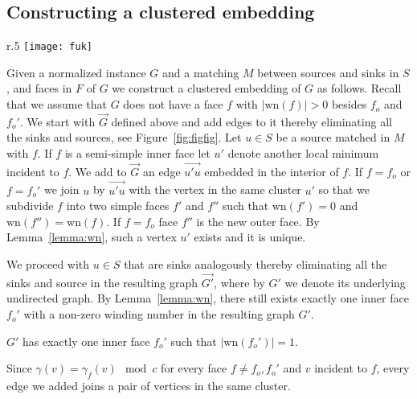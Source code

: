 \documentclass{llncs}
\def\wn{\mathrm{wn}}
\newif\iflong
\begin{document}
\iflong\else
\fi
\subsection{Constructing a clustered embedding}
 \label{sec:const}
 
\begin{wrapfigure}{r}{.5\textwidth}
\centering
\texttt{[image: fuk]}
\caption{Subdividing a semi-simple face   (left). Subdividing a simple face $f_o'$ (right).}

\label{fig:figfig}
\end{wrapfigure}

 
 Given a normalized instance $G$ and a matching $M$ between sources and sinks in $S$, and  faces in $F$ of $G$ we construct a  clustered embedding of $G$ as follows. Recall that we assume that $G$ does not have a face 
 $f$ with $|\wn(f)|>0$ besides $f_o$ and $f_o'$.
  We start with $\overrightarrow{G}$ defined
above and add edges to it thereby eliminating all the sinks and sources, see Figure~\ref{fig:figfig}.
Let $u\in S$ be a source matched in $M$ with $f$. If $f$ is a semi-simple inner face
let $u'$ denote another local minimum  incident to $f$. We add to  $\overrightarrow{G}$
  an edge $\overrightarrow{u'u}$ embedded in the interior of $f$. 
  If $f=f_o$ or $f=f_o'$ we join $u$ by $\overrightarrow{u'u}$ with the vertex in the same cluster $u'$
so that we subdivide $f$ into two simple faces $f'$ and $f''$ such that
$\wn(f')=0$ and $\wn(f'')=\wn(f)$. If $f=f_o$  face $f''$ is the new outer face. By Lemma~\ref{lemma:wn}, such a vertex $u'$ exists and it is unique.




We proceed with $u\in S$ that are sinks analogously thereby eliminating all the sinks and source in the resulting graph $\overrightarrow{G'}$, where by $G'$ we denote its underlying undirected graph.
By Lemma~\ref{lemma:wn}, there still exists exactly one inner face $f_o'$ with a non-zero winding number in the resulting graph $G'$.



\begin{lemma}
\label{lemma:keyFact0}
$G'$ has exactly one inner face $f_o'$ such that $|\wn(f_o')|=1$.
\end{lemma}

Since $\gamma(v) = \gamma_f(v) \mod c$ for every face $f\not=f_o,f_o'$ and $v$ incident to $f$, 
every edge we added joins a pair of vertices in the same cluster.
\end{document}
